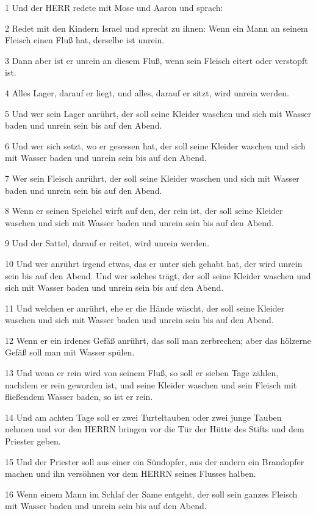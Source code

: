 \par 1 Und der HERR redete mit Mose und Aaron und sprach:
\par 2 Redet mit den Kindern Israel und sprecht zu ihnen: Wenn ein Mann an seinem Fleisch einen Fluß hat, derselbe ist unrein.
\par 3 Dann aber ist er unrein an diesem Fluß, wenn sein Fleisch eitert oder verstopft ist.
\par 4 Alles Lager, darauf er liegt, und alles, darauf er sitzt, wird unrein werden.
\par 5 Und wer sein Lager anrührt, der soll seine Kleider waschen und sich mit Wasser baden und unrein sein bis auf den Abend.
\par 6 Und wer sich setzt, wo er gesessen hat, der soll seine Kleider waschen und sich mit Wasser baden und unrein sein bis auf den Abend.
\par 7 Wer sein Fleisch anrührt, der soll seine Kleider waschen und sich mit Wasser baden und unrein sein bis auf den Abend.
\par 8 Wenn er seinen Speichel wirft auf den, der rein ist, der soll seine Kleider waschen und sich mit Wasser baden und unrein sein bis auf den Abend.
\par 9 Und der Sattel, darauf er reitet, wird unrein werden.
\par 10 Und wer anrührt irgend etwas, das er unter sich gehabt hat, der wird unrein sein bis auf den Abend. Und wer solches trägt, der soll seine Kleider waschen und sich mit Wasser baden und unrein sein bis auf den Abend.
\par 11 Und welchen er anrührt, ehe er die Hände wäscht, der soll seine Kleider waschen und sich mit Wasser baden und unrein sein bis auf den Abend.
\par 12 Wenn er ein irdenes Gefäß anrührt, das soll man zerbrechen; aber das hölzerne Gefäß soll man mit Wasser spülen.
\par 13 Und wenn er rein wird von seinem Fluß, so soll er sieben Tage zählen, nachdem er rein geworden ist, und seine Kleider waschen und sein Fleisch mit fließendem Wasser baden, so ist er rein.
\par 14 Und am achten Tage soll er zwei Turteltauben oder zwei junge Tauben nehmen und vor den HERRN bringen vor die Tür der Hütte des Stifts und dem Priester geben.
\par 15 Und der Priester soll aus einer ein Sündopfer, aus der andern ein Brandopfer machen und ihn versöhnen vor dem HERRN seines Flusses halben.
\par 16 Wenn einem Mann im Schlaf der Same entgeht, der soll sein ganzes Fleisch mit Wasser baden und unrein sein bis auf den Abend.
